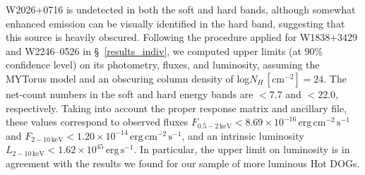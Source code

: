 \documentclass[useAMS,usenatbib]{mnras}
\newcommand*{\lunit}{\ensuremath{\mathrm{erg\,s^{-1}}}}
\newcommand*{\funit}{\ensuremath{\mathrm{erg\, cm^{-2}\,s^{-1}}}}
\newcommand*{\nhunits}{\mathrm{cm^{-2}}}
\begin{document}
W2026+0716 is undetected in both the soft and hard bands, although somewhat enhanced emission can be visually identified in the hard band, suggesting that this source is heavily obscured.
Following the procedure applied for W1838+3429 and W2246--0526 in \S~\ref{results_indiv}, we computed upper limits (at 90\% confidence level) on its photometry, fluxes, and luminosity, assuming the MYTorus model and an obscuring column density of log$N_H\,[\nhunits]=24$. The net-count numbers in the soft and hard energy bands are $<7.7$ and $<22.0$, respectively. Taking into account the proper response matrix and ancillary file, these values correspond to observed fluxes \mbox{$F_{0.5-2\,\mathrm{keV}}<8.69\times10^{-16}\,\funit$} and \mbox{$F_{2-10\,\mathrm{keV}}<1.20\times10^{-14}\,\funit$}, and an intrinsic luminosity \mbox{$L_{2-10\,\mathrm{keV}}<1.62\times10^{45}\,\lunit$}. In particular, the upper limit on luminosity is in agreement with the results we found for our sample of more luminous Hot DOGs.
\end{document}
